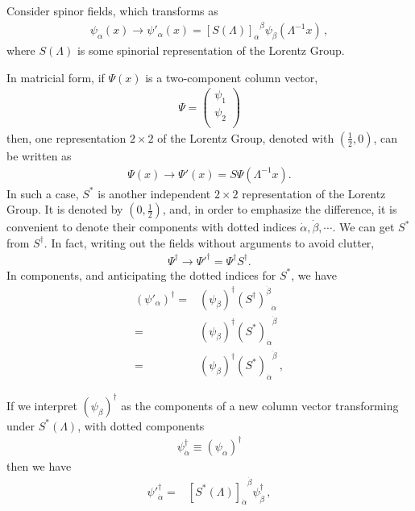 \begin{frame}
Consider spinor fields, which transforms as
\begin{align}
\label{eq:184qft}
  \psi_\alpha(x)\to\psi'_\alpha(x)={\left[ S(\Lambda) \right]_\alpha}^\beta\psi_\beta(\Lambda^{-1}x)\,, 
\end{align}
where $S(\Lambda)$ is some spinorial representation of the Lorentz Group. 
\end{frame}
In matricial form, if $\Psi(x)$ is a two-component column vector, 
\begin{align*}
  \Psi=
  \begin{pmatrix}
   \psi_1\\
   \psi_2\\
  \end{pmatrix}
\end{align*}
then, one representation $2\times2$ of the Lorentz Group, denoted with $(\frac{1}{2},0)$, can be written as
\begin{align}
  \Psi(x)\to \Psi'(x)=S\Psi \left(\Lambda^{-1}x  \right).
\end{align}
In such a case, $S^{*}$ is another independent $2\times2$ representation of the Lorentz Group. It is denoted by $\left( 0,\frac{1}{2}\right)$, and, in order to emphasize the difference, it is convenient to denote their components with dotted indices $\dot{\alpha},\dot{\beta},\cdots$. We can get $S^{*}$ from $S^{\dagger}$. In fact, writing out the fields without arguments to avoid clutter, 
\begin{align}
    \Psi^{\dagger}\to \Psi'^{\dagger}=\Psi^{\dagger}S^{\dagger}.
\end{align}
In components, and anticipating the dotted indices for $S^{*}$, we have
\begin{align}
  \left( \psi'_\alpha \right)^{\dagger}=&\left( \psi_\beta \right)^{\dagger}{\left( S^\dagger\right)^{\dot{\beta}}}_{\dot{\alpha}}\nonumber\\
=&\left( \psi_\beta \right)^{\dagger}{\left( S^*\right)_{\dot{\alpha}}}^{\dot{\beta}}\nonumber\\
=&\left( \psi_\beta \right)^{\dagger}{\left( S^*\right)_{\dot{\alpha}}}^{\dot{\beta}}\,,
\end{align}
\begin{frame}
If we interpret $\left( \psi_\beta \right)^{\dagger}$ as the components of a new column vector transforming under $S^{*}(\Lambda)$, with dotted components
\begin{align}
 \psi_{\dot{\alpha}}^{\dagger}\equiv \left( \psi_\alpha \right)^{\dagger}
\end{align}
then we have
\begin{align}
  {\psi'}_{\dot{\alpha}}^{\dagger}=&{\left[ S^*(\Lambda)\right]_{\dot{\alpha}}}^{\dot{\beta}} \psi_{\dot{\beta}}^{\dagger}\,,
\end{align}
\end{frame}
